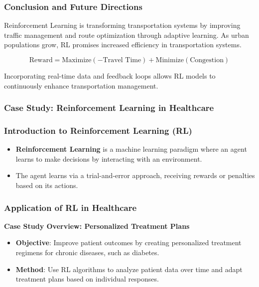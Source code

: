 \documentclass[aspectratio=169]{beamer}
\begin{document}
\begin{frame}[fragile]
  \frametitle{Conclusion and Future Directions}
  Reinforcement Learning is transforming transportation systems by improving traffic management and route optimization through adaptive learning. As urban populations grow, RL promises increased efficiency in transportation systems.

  \begin{equation}
  \text{Reward} = \text{Maximize} \left( -\text{Travel Time} \right) + \text{Minimize} \left( \text{Congestion} \right)
  \end{equation}

  Incorporating real-time data and feedback loops allows RL models to continuously enhance transportation management.
\end{frame}

\begin{frame}[fragile]
  \frametitle{Case Study: Reinforcement Learning in Healthcare}
\end{frame}

\begin{frame}[fragile]
  \frametitle{Introduction to Reinforcement Learning (RL)}
  \begin{itemize}
      \item \textbf{Reinforcement Learning} is a machine learning paradigm where an agent learns to make decisions by interacting with an environment.
      \item The agent learns via a trial-and-error approach, receiving rewards or penalties based on its actions.
  \end{itemize}
\end{frame}

\begin{frame}[fragile]
  \frametitle{Application of RL in Healthcare}
  
  \textbf{Case Study Overview: Personalized Treatment Plans}
  \begin{itemize}
      \item \textbf{Objective}: Improve patient outcomes by creating personalized treatment regimens for chronic diseases, such as diabetes.
      \item \textbf{Method}: Use RL algorithms to analyze patient data over time and adapt treatment plans based on individual responses.
  \end{itemize}
\end{frame}
\end{document}
